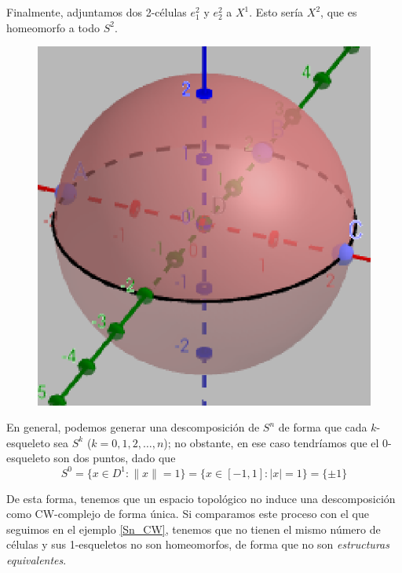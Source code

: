 \begin{ejem}
\newpage
Finalmente, adjuntamos dos 2-células $e^2_1$ y $e^2_2$ a $X^1$. Esto sería $X^2$, que es homeomorfo a todo $S^2$.

\begin{figure}[h]
\centering
\includegraphics[scale=0.7]{Figures/S2paso3}
\end{figure}

En general, podemos generar una descomposición de $S^n$ de forma que cada $k$-esqueleto sea $S^k$ ($k=0,1,2,\dots,n$); no obstante, en ese caso tendríamos que el 0-esqueleto son dos puntos, dado que \[S^0=\{x \in D^1: \|x\|=1\}=\{x \in [-1,1]: |x|=1\}=\{\pm 1\}\]
\end{ejem}

De esta forma, tenemos que un espacio topológico no induce una descomposición como CW-complejo de forma única. Si comparamos este proceso con el que seguimos en el ejemplo \ref{Sn_CW}, tenemos que no tienen el mismo número de células y sus 1-esqueletos no son homeomorfos, de forma que no son \textit{estructuras equivalentes}.
\newpage

\begin{teo}\label{TCCWF}\end{teo}


